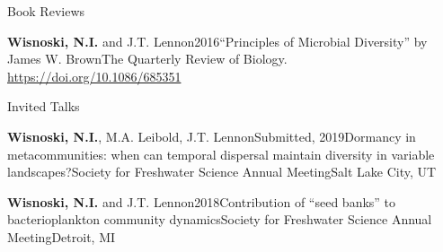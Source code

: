 \documentclass{resume} %
\begin{document}
\bigskip


\begin{rhangSection}{Book Reviews}

\begin{Publication}{{\bf Wisnoski, N.I.} and J.T. Lennon}{2016}{\enquote{Principles of Microbial Diversity} by James W. Brown}{The Quarterly Review of Biology. \url{https://doi.org/10.1086/685351}}
\end{Publication}

\end{rhangSection}

\bigskip

\begin{rhangSection}{Invited Talks}

  \begin{Presentation}{{\bf Wisnoski, N.I.}, M.A. Leibold, J.T. Lennon}{Submitted, 2019}{Dormancy in metacommunities: when can temporal dispersal maintain diversity in variable landscapes?}{Society for Freshwater Science Annual Meeting}{Salt Lake City, UT}
  \end{Presentation}
  
  \begin{Presentation}{{\bf Wisnoski, N.I.} and J.T. Lennon}{2018}{Contribution of \enquote{seed banks} to bacterioplankton community dynamics}{Society for Freshwater Science Annual Meeting}{Detroit, MI}
  \end{Presentation}

\end{rhangSection}

\bigskip
\end{document}
